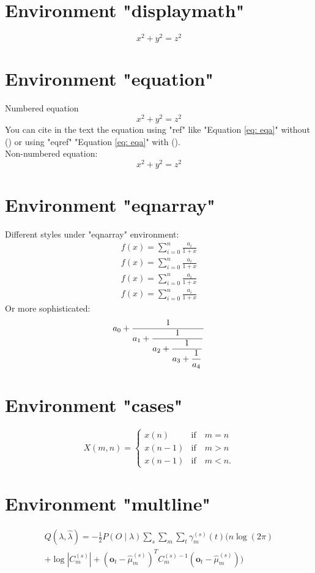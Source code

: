 \section{Environment "displaymath"}
\begin{displaymath}
	x^2+y^2=z^2
\end{displaymath}
\section{Environment "equation" }
Numbered equation
\begin{equation}
	x^2+y^2=z^2
	\label{eq: eqa}
\end{equation}
You can cite in the text the equation using "ref" like "Equation \ref{eq: eqa}" without () or using "eqref" "Equation \eqref{eq: eqa}" with ().\\
Non-numbered equation:
\begin{equation*}
	x^2+y^2=z^2
\end{equation*}
\section{Environment "eqnarray" }
Different styles under "eqnarray" environment:
\begin{eqnarray*}
	f(x) = \sum_{i=0}^{n} \frac{a_i}{1+x} \\
	\textstyle f(x) = \sum_{i=0}^{n} \frac{a_i}{1+x} \\
	\scriptstyle f(x) = \sum_{i=0}^{n} \frac{a_i}{1+x} \\
	\scriptscriptstyle f(x) = \sum_{i=0}^{n} \frac{a_i}{1+x}
\end{eqnarray*}
Or more sophisticated:
\[
a_0+{1\over\displaystyle a_1+
	{1\over\displaystyle a_2+
		{1 \over\displaystyle a_3 + 
			{1 \over\displaystyle a_4}}}}
\]
\section{Environment "cases"} 
$$
X(m,n)=
\begin{cases}
	x(n) & \text{if} \quad m=n \\
	x(n-1) & \text{if} \quad m>n\\
	x(n-1) & \text{if} \quad m<n.
\end{cases}
$$

\section{Environment "multline"} 
\begin{multline}
	Q(\lambda,\hat{\lambda}) = -\frac{1}{2} P(O \mid \lambda ) \sum_s \sum_m \sum_t \gamma_m^{(s)} (t) \biggl( n \log(2 \pi ) \\
	+ \log \left| C_m^{(s)} \right| + \left( \mathbf{o}_t - \hat{\mu}_m^{(s)} \right) ^T C_m^{(s)-1} \left(\mathbf{o}_t - \hat{\mu}_m^{(s)}\right) \biggr)
\end{multline}

